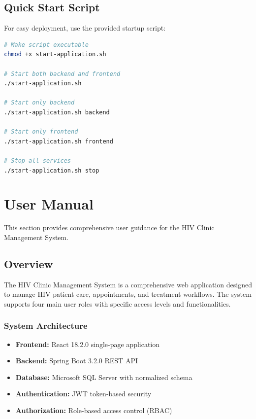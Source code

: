 \documentclass[12pt,a4paper]{article}
\begin{document}
\subsection{Quick Start Script}

For easy deployment, use the provided startup script:

\begin{lstlisting}[language=bash]
# Make script executable
chmod +x start-application.sh

# Start both backend and frontend
./start-application.sh

# Start only backend
./start-application.sh backend

# Start only frontend  
./start-application.sh frontend

# Stop all services
./start-application.sh stop
\end{lstlisting}

\section{User Manual}

This section provides comprehensive user guidance for the HIV Clinic Management System.

\subsection{Overview}

The HIV Clinic Management System is a comprehensive web application designed to manage HIV patient care, appointments, and treatment workflows. The system supports four main user roles with specific access levels and functionalities.

\subsubsection{System Architecture}

\begin{itemize}
    \item \textbf{Frontend:} React 18.2.0 single-page application
    \item \textbf{Backend:} Spring Boot 3.2.0 REST API
    \item \textbf{Database:} Microsoft SQL Server with normalized schema
    \item \textbf{Authentication:} JWT token-based security
    \item \textbf{Authorization:} Role-based access control (RBAC)
\end{itemize}
\end{document}
